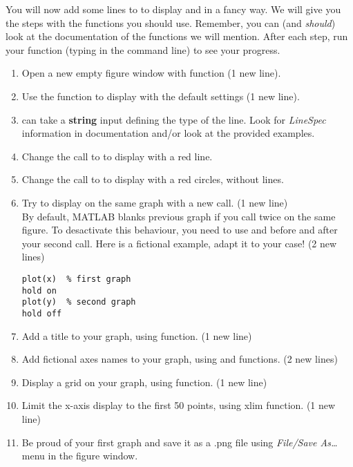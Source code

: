 \documentclass{article}
\begin{document}
You will now add some lines to  to display  and  in a fancy way.
We will give you the steps with the functions you should use.
Remember, you can (and \emph{should}) look at the documentation of the functions we will mention.
After each step, run your function (typing  in the command line) to see your progress.
\begin{enumerate}
  \item Open a new empty figure window with  function (1 new line).
  \item Use the  function to display  with the default settings (1 new line).
  \item {} can take a \textbf{string} input defining the type of the line.
    Look for \emph{LineSpec} information in  documentation and/or look at the provided examples.
  \item Change the call to  to display  with a red line.
  \item Change the call to  to display  with a red circles, without lines.
  \item Try to display  on the same graph with a new  call. (1 new line)\\
    By default, MATLAB blanks previous graph if you call  twice on the same figure.
    To desactivate this behaviour, you need to use  and  before and after
    your second  call.
    Here is a fictional example, adapt it to your case! (2 new lines)
\begin{lstlisting}
plot(x)  % first graph
hold on
plot(y)  % second graph
hold off
\end{lstlisting}
  \item Add a title to your graph, using  function. (1 new line)
  \item Add fictional axes names to your graph, using  and  functions. (2 new lines)
  \item Display a grid on your graph, using  function. (1 new line)
  \item Limit the x-axis display to the first 50 points, using \mcode xlim function. (1 new line)
  \item Be proud of your first graph and save it as a .png file using \emph{File/Save As\dots} menu in the figure window.
\end{enumerate}
\end{document}
